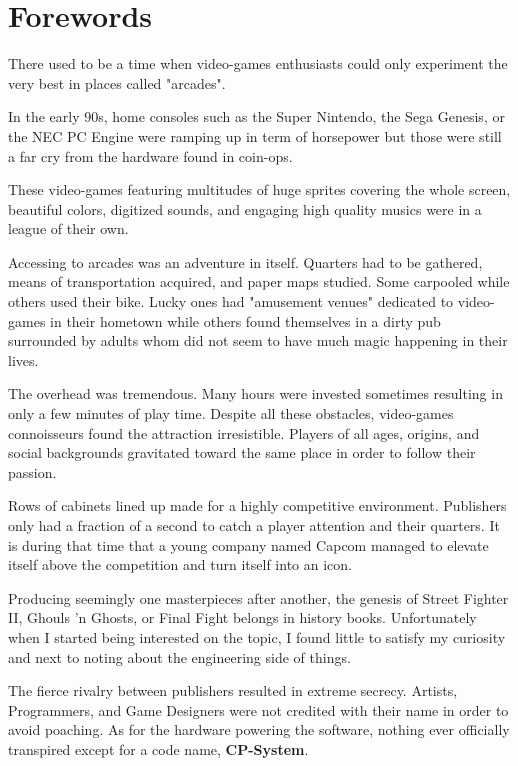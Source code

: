 \chapter*{Forewords}

There used to be a time when video-games enthusiasts could only experiment the very best in places called "arcades". 

In the early 90s, home consoles such as the Super Nintendo, the Sega Genesis, or the NEC PC Engine were ramping up in term of horsepower but those were still a far cry from the hardware found in coin-ops.

These video-games featuring multitudes of huge sprites covering the whole screen, beautiful colors, digitized sounds, and engaging high quality musics were in a league of their own.

Accessing to arcades was an adventure in itself. Quarters had to be gathered, means of transportation acquired, and paper maps studied. Some carpooled while others used their bike. Lucky ones had "amusement venues" dedicated to video-games in their hometown while others found themselves in a dirty pub surrounded by adults whom did not seem to have much magic happening in their lives. 

The overhead was tremendous. Many hours were invested sometimes resulting in only a few minutes of play time. Despite all these obstacles, video-games connoisseurs found the attraction irresistible. Players of all ages, origins, and social backgrounds gravitated toward the same place in order to follow their passion. 

Rows of cabinets lined up made for a highly competitive environment. Publishers only had a fraction of a second to catch a player attention and their quarters. It is during that time that a young company named Capcom  managed to elevate itself above the competition and turn itself into an icon.

Producing seemingly one masterpieces after another, the genesis of Street Fighter II, Ghouls 'n Ghosts, or Final Fight belongs in history books. Unfortunately when I started being interested on the topic, I found little to satisfy my curiosity and next to noting about the engineering side of things. 

The fierce rivalry between publishers resulted in extreme secrecy. Artists, Programmers, and Game Designers were not credited with their name in order to avoid poaching. As for the hardware powering the software, nothing ever officially transpired except for a code name, \textbf{CP-System}.

